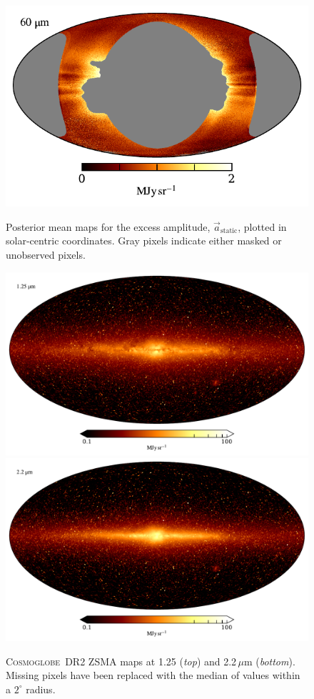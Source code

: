\documentclass{aa}
\renewcommand{\a}[0]{\vec{a}}
\newcommand{\cosmoglobe}{\textsc{Cosmoglobe}}
\begin{document}
\begin{figure}
  \includegraphics[width=0.83\columnwidth]{figs/mean_solar_07.pdf}\\\vspace*{-2mm}
  \caption{Posterior mean
    maps for the excess amplitude, $\a_{\mathrm{static}}$, plotted in
    solar-centric coordinates. Gray pixels indicate either masked or
    unobserved pixels.}
  \label{fig:solarmaps_posterior}
\end{figure}

\begin{figure}
	\centering
	\includegraphics[width=0.96\linewidth]{figs/map_01.pdf}\\
	\includegraphics[width=0.96\linewidth]{figs/map_02.pdf}
	\caption{\cosmoglobe\ DR2 ZSMA maps at 1.25 (\emph{top}) and
          2.2$\,\mu$m (\emph{bottom}). Missing pixels have been replaced with
          the median of values within a $2^\circ$ radius.}
	\label{fig:freqmaps1_2}
\end{figure}
\end{document}
